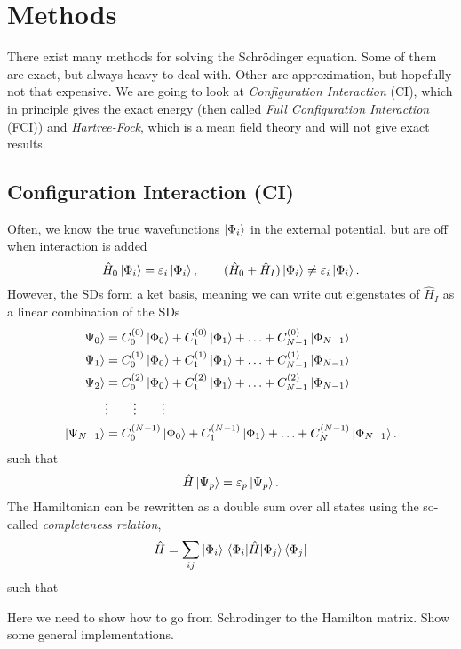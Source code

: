 \section{Methods} \label{sec:methods}
There exist many methods for solving the Schr\"odinger equation. Some of them are exact, but always heavy to deal with. Other are approximation, but hopefully not that expensive. We are going to look at \textit{Configuration Interaction} (CI), which in principle gives the exact energy (then called \textit{Full Configuration Interaction }(FCI)) and \textit{Hartree-Fock}, which is a mean field theory and will not give exact results.

\subsection{Configuration Interaction (CI)}
Often, we know the true wavefunctions $\ket{\Phi_i}$ in the external potential, but are off when interaction is added
\begin{equation}
\hat{H}_0\ket{\Phi_i}=\varepsilon_i\ket{\Phi_i},\qquad (\hat{H}_0+\hat{H}_I)\ket{\Phi_i}\neq\varepsilon_i\ket{\Phi_i}.
\end{equation}
However, the SDs form a ket basis, meaning we can write out eigenstates of $\hat{H}_I$ as a linear combination of the SDs
\begin{align}
\ket{\Psi_0}&=C_0^{(0)}\ket{\Phi_0}+C_1^{(0)}\ket{\Phi_1}+\hdots+C_{N-1}^{(0)}\ket{\Phi_{N-1}}\notag\\
\ket{\Psi_1}&=C_0^{(1)}\ket{\Phi_0}+C_1^{(1)}\ket{\Phi_1}+\hdots+C_{N-1}^{(1)}\ket{\Phi_{N-1}}\notag\\
\ket{\Psi_2}&=C_0^{(2)}\ket{\Phi_0}+C_1^{(2)}\ket{\Phi_1}+\hdots+C_{N-1}^{(2)}\ket{\Phi_{N-1}}\\
&\vdots\qquad\vdots\qquad\vdots\notag\\
\ket{\Psi_{N-1}}&=C_0^{(N-1)}\ket{\Phi_0}+C_1^{(N-1)}\ket{\Phi_1}+\hdots+C_N^{(N-1)}\ket{\Phi_{N-1}}.\notag
\end{align}
such that 
\begin{equation}
\hat{H}\ket{\Psi_p}=\varepsilon_p\ket{\Psi_p}.
\end{equation}
The Hamiltonian can be rewritten as a double sum over all states using the so-called \textit{completeness relation}, 
\begin{equation}
\hat{H}=\sum_{ij}\ket{\Phi_i}\mel{\Phi_i}{\hat{H}}{\Phi_j}\bra{\Phi_j}
\end{equation}
such that

Here we need to show how to go from Schrodinger to the Hamilton matrix. Show some general implementations.

